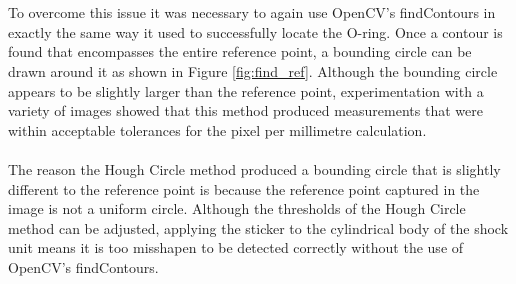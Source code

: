 			\\\\
			To overcome this issue it was necessary to again use OpenCV’s findContours in exactly the same way it used to successfully locate the O-ring. Once a contour is found that encompasses the entire reference point, a bounding circle can be drawn around it as shown in Figure \ref{fig:find_ref}. Although the bounding circle appears to be slightly larger than the reference point, experimentation with a variety of images showed that this method produced measurements that were within acceptable tolerances for the pixel per millimetre calculation.
			\\\\
			The reason the Hough Circle method produced a bounding circle that is slightly different to the reference point is because the reference point captured in the image is not a uniform circle. Although the thresholds of the Hough Circle method can be adjusted, applying the sticker to the cylindrical body of the shock unit means it is too misshapen to be detected correctly without the use of OpenCV’s findContours.
